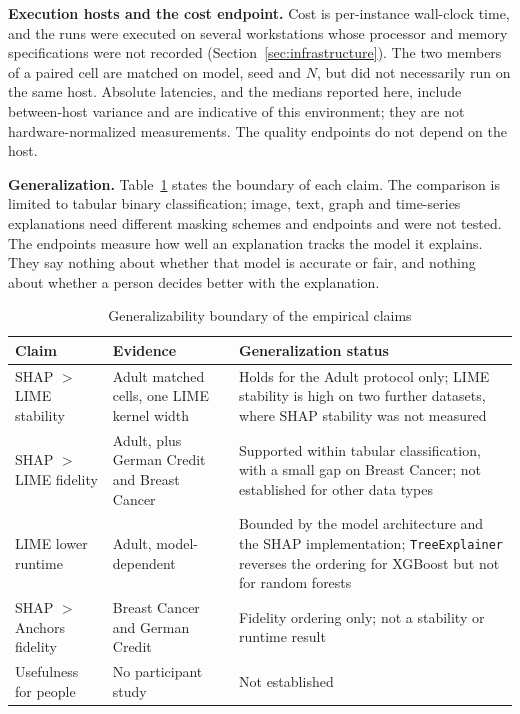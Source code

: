 \documentclass[11pt,a4paper]{article}
\begin{document}
\textbf{Execution hosts and the cost endpoint.} Cost is per-instance
wall-clock time, and the runs were executed on several workstations whose
processor and memory specifications were not recorded
(Section~\ref{sec:infrastructure}). The two members of a paired cell are
matched on model, seed and $N$, but did not necessarily run on the same
host. Absolute latencies, and the medians reported here, include
between-host variance and are indicative of this environment; they are not
hardware-normalized measurements. The quality endpoints do not depend on
the host.

\textbf{Generalization.} Table~\ref{tab:generalizability_boundary} states
the boundary of each claim. The comparison is limited to tabular binary
classification; image, text, graph and time-series explanations need
different masking schemes and endpoints and were not tested. The endpoints
measure how well an explanation tracks the model it explains. They say
nothing about whether that model is accurate or fair, and nothing about
whether a person decides better with the explanation.

\begin{table}[htb]
\centering
\caption{Generalizability boundary of the empirical claims}
\label{tab:generalizability_boundary}
\begin{tabularx}{\linewidth}{p{3.0cm} X X}
\toprule
\textbf{Claim} & \textbf{Evidence} & \textbf{Generalization status} \\
\midrule
SHAP $>$ LIME stability & Adult matched cells, one LIME kernel width & Holds for the Adult protocol only; LIME stability is high on two further datasets, where SHAP stability was not measured \\
SHAP $>$ LIME fidelity & Adult, plus German Credit and Breast Cancer & Supported within tabular classification, with a small gap on Breast Cancer; not established for other data types \\
LIME lower runtime & Adult, model-dependent & Bounded by the model architecture and the SHAP implementation; \texttt{TreeExplainer} reverses the ordering for XGBoost but not for random forests \\
SHAP $>$ Anchors fidelity & Breast Cancer and German Credit & Fidelity ordering only; not a stability or runtime result \\
Usefulness for people & No participant study & Not established \\
\bottomrule
\end{tabularx}
\end{table}
\end{document}
